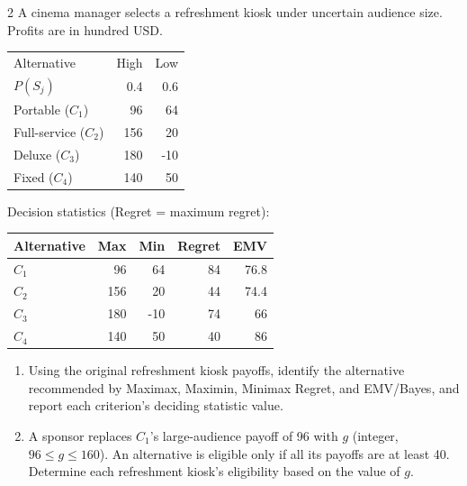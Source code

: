 \begin{multicols}{2}
\raggedcolumns
{}
A cinema manager selects a refreshment kiosk under uncertain audience size. Profits are in hundred USD.

\begin{center}\small\setlength{\tabcolsep}{4pt}
	\begin{tabular}{lrr}\toprule
		Alternative & High & Low\\
		$P(S_j)$ & 0.4 & 0.6\\ \midrule
		Portable ($C_1$) & 96 & 64\\
		Full-service ($C_2$) & 156 & 20\\
		Deluxe ($C_3$) & 180 & -10\\
		Fixed ($C_4$) & 140 & 50\\
		\bottomrule
	\end{tabular}
\end{center} \vspace{-3mm}

Decision statistics (Regret = maximum regret):

\begin{center}\small\setlength{\tabcolsep}{4pt}
	\begin{tabular}{lrrrr}\toprule
		Alternative & Max & Min & Regret & EMV\\ \midrule
		$C_1$ & 96 & 64 & 84 & 76.8\\
		$C_2$ & 156 & 20 & 44 & 74.4\\
		$C_3$ & 180 & -10 & 74 & 66\\
		$C_4$ & 140 & 50 & 40 & 86\\
		\bottomrule
	\end{tabular}
\end{center}

\begin{enumerate}[label=\textbf{(\alph*)},leftmargin=*]
	\item Using the original refreshment kiosk payoffs, identify the alternative recommended by Maximax, Maximin, Minimax Regret, and EMV/Bayes, and report each criterion's deciding statistic value. 

	\item A sponsor replaces $C_1$'s large-audience payoff of 96 with $g$ (integer, $96\leq g\leq160$). An alternative is eligible only if all its payoffs are at least 40. Determine each refreshment kiosk's eligibility based on the value of $g$. 


\end{enumerate}
\end{multicols}
